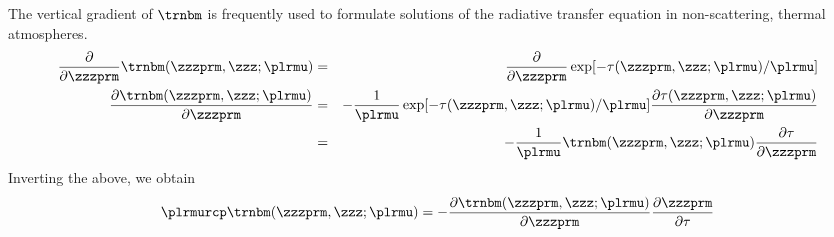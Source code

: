 \documentclass[12pt]{article}
\begin{document}
The vertical gradient of $\trnbm$ is frequently used to formulate
solutions of the radiative transfer equation in non-scattering,
thermal atmospheres.
\begin{eqnarray}
\frac{\partial}{\partial \zzzprm} \trnbm(\zzzprm,\zzz;\plrmu) & = &
\frac{\partial}{\partial \zzzprm} \exp[-\tau(\zzzprm,\zzz;\plrmu)/\plrmu]
\nonumber \\
\frac{\partial \trnbm(\zzzprm,\zzz;\plrmu)}{\partial \zzzprm} & = &
-\frac{1}{\plrmu} \exp[-\tau(\zzzprm,\zzz;\plrmu)/\plrmu] 
\frac{\partial \tau(\zzzprm,\zzz;\plrmu)}{\partial \zzzprm}
\nonumber \\
& = & -\frac{1}{\plrmu} \trnbm(\zzzprm,\zzz;\plrmu) 
\frac{\partial \tau}{\partial \zzzprm}
\label{eqn:trn_grd}
\end{eqnarray}
Inverting the above, we obtain
\begin{equation}
\plrmurcp \trnbm(\zzzprm,\zzz;\plrmu) =  
- \frac{\partial \trnbm(\zzzprm,\zzz;\plrmu)}{\partial \zzzprm}
\frac{\partial \zzzprm}{\partial \tau}
\label{eqn:trn_grd_2}
\end{equation}
\end{document}
